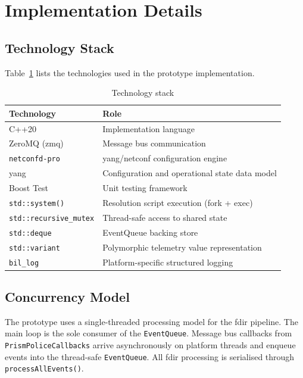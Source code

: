 \section{Implementation Details}\label{sec:impl-details}

\subsection{Technology Stack}

Table~\ref{tab:technology-stack} lists the technologies used in the prototype implementation.

\begin{table}[htbp]
\centering
\caption{Technology stack}
\label{tab:technology-stack}
\begin{tabular}{p{4cm} p{9cm}}
\toprule
Technology & Role \\
\midrule
C++20 & Implementation language \\
ZeroMQ (zmq) & Message bus communication \\
\texttt{netconfd-pro} & \gls{yang}/\gls{netconf} configuration engine \\
\gls{yang} & Configuration and operational state data model \\
Boost Test & Unit testing framework \\
\texttt{std::system()} & Resolution script execution (fork + exec) \\
\texttt{std::recursive\_mutex} & Thread-safe access to shared state \\
\texttt{std::deque} & EventQueue backing store \\
\texttt{std::variant} & Polymorphic telemetry value representation \\
\texttt{bil\_log} & Platform-specific structured logging \\
\bottomrule
\end{tabular}
\end{table}

\subsection{Concurrency Model}

The prototype uses a single-threaded processing model for the \gls{fdir} pipeline. The main loop is the sole consumer of the \texttt{EventQueue}. Message bus callbacks from \texttt{PrismPoliceCallbacks} arrive asynchronously on platform threads and enqueue events into the thread-safe \texttt{EventQueue}. All \gls{fdir} processing is serialised through \texttt{processAllEvents()}.

